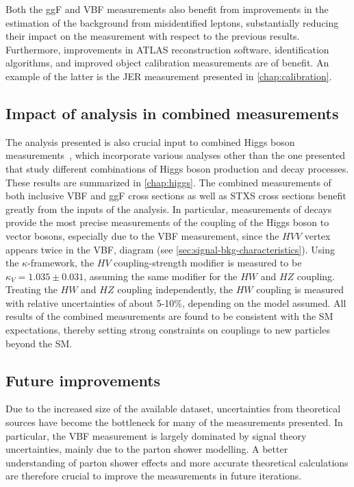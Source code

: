 Both the ggF and VBF measurements also benefit from improvements in the estimation of the background from misidentified leptons, substantially reducing their impact on the measurement with respect to the previous results. 
Furthermore, improvements in ATLAS reconstruction software, identification algorithms, and improved object calibration measurements are of benefit. 
An example of the latter is the JER measurement presented in \cref{chap:calibration}. 

\subsection{Impact of analysis in combined measurements}
The analysis presented is also crucial input to combined Higgs boson measurements~\cite{NaturePaper}, which incorporate various analyses other than the one presented that study different combinations of Higgs boson production and decay processes. These results are summarized in \cref{chap:higgs}.
The combined measurements of both inclusive VBF and ggF cross sections as well as STXS cross sections benefit greatly from the inputs of the \HWW analysis.
In particular, measurements of \HWW decays provide the most precise measurements of the coupling of the Higgs boson to vector bosons, especially due to the VBF measurement, since the $HVV$ vertex appears twice in the VBF, \HWW diagram (see \cref{sec:signal-bkg-characteristics}). 
Using the $\kappa$-framework, the $HV$ coupling-strength modifier is measured to be $\kappa_{V} = 1.035 \pm 0.031$, assuming the same modifier for the $HW$ and $HZ$ coupling.
Treating the $HW$ and $HZ$ coupling independently, the $HW$ coupling is measured with relative uncertainties of about 5-10\%, depending on the model assumed. 
All results of the combined measurements are found to be consistent with the SM expectations, thereby setting strong constraints on couplings to new particles beyond the SM.  

\subsection{Future improvements}
Due to the increased size of the available dataset, uncertainties from theoretical sources have become the bottleneck for many of the \HWW measurements presented.
In particular, the VBF measurement is largely dominated by signal theory uncertainties, mainly due to the parton shower modelling.
A better understanding of parton shower effects and more accurate theoretical calculations are therefore crucial to improve the measurements in future iterations.~\cite{Jger2020} 

